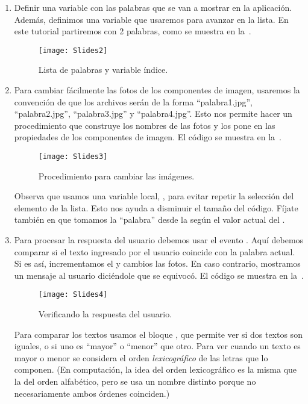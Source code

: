 \begin{enumerate}

\item Definir una variable  con las palabras
  que se van a mostrar en la aplicación. Además, definimos una
  variable  que usaremos para avanzar en la lista. En este tutorial partiremos
  con 2 palabras, como se muestra en la~.

\begin{figure}[H]
  \centering
  \texttt{[image: Slides2]}
  \caption{Lista de palabras y variable índice.}
  \label{fig:Slides2}
\end{figure}

\item Para cambiar fácilmente las fotos de los componentes de imagen,
  usaremos la convención de que los archivos serán de la forma
  ``palabra1.jpg'', ``palabra2.jpg'', ``palabra3.jpg'' y
  ``palabra4.jpg''. Esto nos permite hacer un procedimiento que
  construye los nombres de las fotos y los pone en las propiedades
   de los componentes de imagen. El código se muestra
  en la~.

\begin{figure}[H]
  \centering
  \texttt{[image: Slides3]}
  \caption{Procedimiento para cambiar las imágenes.}
  \label{fig:Slides3}
\end{figure}

Observa que usamos una variable local, , para
evitar repetir la selección del elemento de la lista. Esto nos ayuda a
disminuir el tamaño del código. Fíjate también en que tomamos la
``palabra'' desde la  según el valor actual
del .

\item Para procesar la respuesta del usuario debemos usar el evento
  . Aquí debemos comparar si el texto
  ingresado por el usuario coincide con la palabra actual. Si es así,
  incrementamos el  y cambios las fotos. En caso
  contrario, mostramos un mensaje al usuario diciéndole que se
  equivocó. El código se muestra en la~.

\begin{figure}[H]
  \centering
  \texttt{[image: Slides4]}
  \caption{Verificando la respuesta del usuario.}
  \label{fig:Slides4}
\end{figure}

Para comparar los textos usamos el bloque , que
permite ver si dos textos son iguales, o si uno es ``mayor'' o
``menor'' que otro. Para ver cuando un texto es mayor o menor se
considera el orden \emph{lexicográfico} de las letras que lo
componen. (En computación, la idea del orden lexicográfico es la misma
que la del orden alfabético, pero se usa un nombre distinto porque no
necesariamente ambos órdenes coinciden.)

\end{enumerate}

